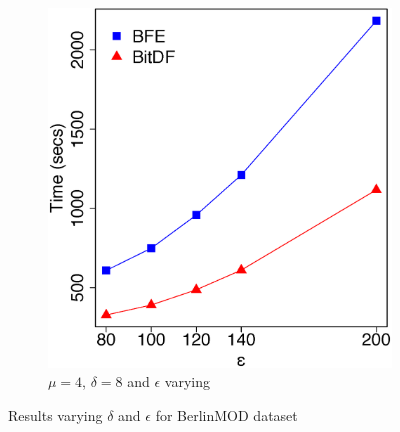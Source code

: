 {\begin{figure}[h!]
\begin{subfigure}[t]{0.48\textwidth}
        \includegraphics[width=\textwidth]{images/BerlinMOD_n_4_l_8_varying_g.eps}
        \caption{$\mu = 4$, $\delta = 8$ and $\epsilon$ varying}
        \label{fig:berlinmod_vary_g}
    \end{subfigure}
    \caption{Results varying $\delta$ and $\epsilon$ for BerlinMOD dataset}
    \label{fig:berlinmod_results}
\end{figure}

}
